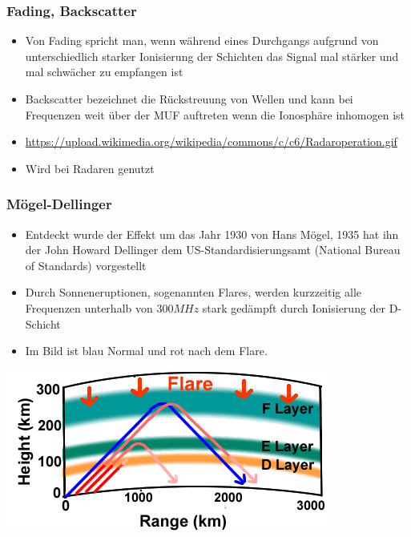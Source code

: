 \begin{frame}
    \frametitle{Fading, Backscatter}
        \begin{center}
    \begin{itemize}
    			\item Von Fading spricht man, wenn während eines Durchgangs aufgrund von unterschiedlich starker Ionisierung der Schichten das Signal mal stärker und mal schwächer zu empfangen ist
    			\item Backscatter bezeichnet die Rückstreuung von Wellen und kann bei Frequenzen weit über der MUF auftreten wenn die Ionosphäre inhomogen ist  			
    			\item \url{https://upload.wikimedia.org/wikipedia/commons/c/c6/Radaroperation.gif}
    			\item Wird bei Radaren genutzt
    \end{itemize}
    \end{center}
\end{frame}

\begin{frame}
    \frametitle{Mögel-Dellinger}
    \begin{center}
    \begin{itemize}
    			\item Entdeckt wurde der Effekt um das Jahr 1930 von Hans Mögel, 1935 hat ihn der John Howard Dellinger dem US-Standardisierungsamt (National Bureau of Standards) vorgestellt
    			\item Durch Sonneneruptionen, sogenannten Flares, werden kurzzeitig alle Frequenzen unterhalb von $300MHz$ stark gedämpft durch Ionisierung der D-Schicht
    			\item Im Bild ist blau Normal und rot nach dem Flare. \\[1em]
    \end{itemize}
        \includegraphics[width=.6\textwidth,height=.4\textheight,keepaspectratio]{a08/FlareNPS.png}
    \end{center}
\end{frame}

